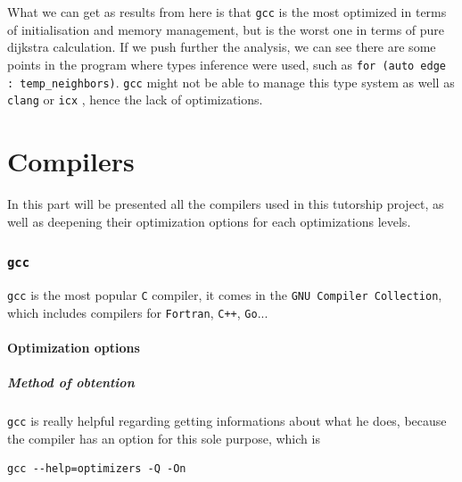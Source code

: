 \documentclass{rapport}
\newcommand{\gcc}{\texttt{gcc} }
\newcommand{\icx}{\texttt{icx} }
\newcommand{\clang}{\texttt{clang} }
\begin{document}
What we can get as results from here is that \gcc is the most optimized in terms of initialisation and memory management, but is the worst one in terms 
of pure dijkstra calculation. \newline
If we push further the analysis, we can see there are some points in the program where types inference were used, such as \texttt{for (auto edge : temp\_neighbors)}. 
\gcc might not be able to manage this type system as well as \clang or \icx, hence the lack of optimizations.

\clearpage
\part{Compilers}
In this part will be presented all the compilers used in this tutorship project, as well as deepening their optimization options for each optimizations levels.
\section{\gcc}
\gcc is the most popular \texttt{C} compiler, it comes in the \texttt{GNU Compiler Collection}, which includes compilers for \texttt{Fortran}, \texttt{C++}, \texttt{Go}...
\subsection{Optimization options}
\subsubsection{Method of obtention}
\gcc is really helpful regarding getting informations about what he does, because the compiler has an option for this sole purpose, which is
\begin{verbatim}
gcc --help=optimizers -Q -On
\end{verbatim}
\end{document}
